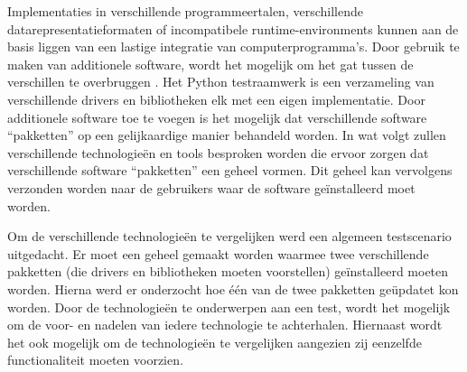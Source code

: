 Implementaties in verschillende programmeertalen, verschillende datarepresentatieformaten of incompatibele runtime-environments kunnen aan de basis liggen van een lastige integratie van computerprogramma's.
Door gebruik te maken van additionele software, wordt het mogelijk om het gat tussen de verschillen te overbruggen  \citep{callahan1998software}.
Het Python testraamwerk is een verzameling van verschillende drivers en bibliotheken elk met een eigen implementatie.
Door additionele software toe te voegen is het mogelijk dat verschillende software ``pakketten'' op een gelijkaardige manier behandeld worden.
In wat volgt zullen verschillende technologieën en tools besproken worden die ervoor zorgen dat verschillende software ``pakketten'' een geheel vormen.
Dit geheel kan vervolgens verzonden worden naar de gebruikers waar de software geïnstalleerd moet worden.

Om de verschillende technologieën te vergelijken werd een algemeen testscenario uitgedacht.
Er moet een geheel gemaakt worden waarmee twee verschillende pakketten (die drivers en bibliotheken moeten voorstellen) geïnstalleerd moeten worden.
Hierna werd er onderzocht hoe één van de twee pakketten geüpdatet kon worden.
Door de technologieën te onderwerpen aan een test, wordt het mogelijk om de voor- en nadelen van iedere technologie te achterhalen.
Hiernaast wordt het ook mogelijk om de technologieën te vergelijken aangezien zij eenzelfde functionaliteit moeten voorzien.

